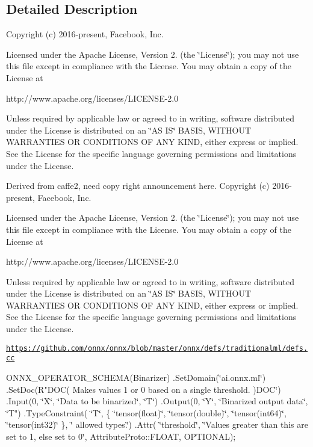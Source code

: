 \subsection{Detailed Description}
Copyright (c) 2016-\/present, Facebook, Inc.

Licensed under the Apache License, Version 2. (the \char`\"{}\+License\char`\"{}); you may not use this file except in compliance with the License. You may obtain a copy of the License at \begin{DoxyVerb}http://www.apache.org/licenses/LICENSE-2.0
\end{DoxyVerb}


Unless required by applicable law or agreed to in writing, software distributed under the License is distributed on an \char`\"{}\+A\+S I\+S\char`\"{} B\+A\+S\+IS, W\+I\+T\+H\+O\+UT W\+A\+R\+R\+A\+N\+T\+I\+ES OR C\+O\+N\+D\+I\+T\+I\+O\+NS OF A\+NY K\+I\+ND, either express or implied. See the License for the specific language governing permissions and limitations under the License.

Derived from caffe2, need copy right announcement here. Copyright (c) 2016-\/present, Facebook, Inc.

Licensed under the Apache License, Version 2. (the \char`\"{}\+License\char`\"{}); you may not use this file except in compliance with the License. You may obtain a copy of the License at \begin{DoxyVerb}http://www.apache.org/licenses/LICENSE-2.0
\end{DoxyVerb}


Unless required by applicable law or agreed to in writing, software distributed under the License is distributed on an \char`\"{}\+A\+S I\+S\char`\"{} B\+A\+S\+IS, W\+I\+T\+H\+O\+UT W\+A\+R\+R\+A\+N\+T\+I\+ES OR C\+O\+N\+D\+I\+T\+I\+O\+NS OF A\+NY K\+I\+ND, either express or implied. See the License for the specific language governing permissions and limitations under the License.

\href{https://github.com/onnx/onnx/blob/master/onnx/defs/traditionalml/defs.cc}{\tt https\+://github.\+com/onnx/onnx/blob/master/onnx/defs/traditionalml/defs.\+cc}

O\+N\+N\+X\+\_\+\+O\+P\+E\+R\+A\+T\+O\+R\+\_\+\+S\+C\+H\+E\+M\+A(\+Binarizer) .Set\+Domain(\char`\"{}ai.\+onnx.\+ml\char`\"{}) .Set\+Doc(R"D\+OC( Makes values 1 or 0 based on a single threshold. )D\+OC\char`\"{})
.\+Input(0, \char`\"{}X\char`\"{}, \char`\"{}Data to be binarized\char`\"{}, \char`\"{}T\char`\"{})
.\+Output(0, \char`\"{}Y\char`\"{}, \char`\"{}Binarized output data\char`\"{}, \char`\"{}T") .Type\+Constraint( \char`\"{}\+T\char`\"{}, \{ \char`\"{}tensor(float)\char`\"{}, \char`\"{}tensor(double)\char`\"{}, \char`\"{}tensor(int64)\char`\"{}, \char`\"{}tensor(int32)\char`\"{} \}, \char`\"{} allowed types.\char`\"{}) .Attr( \char`\"{}threshold\char`\"{}, \char`\"{}\+Values greater than this are set to 1, else set to 0\char`\"{}, Attribute\+Proto\+::\+F\+L\+O\+AT, O\+P\+T\+I\+O\+N\+AL);

